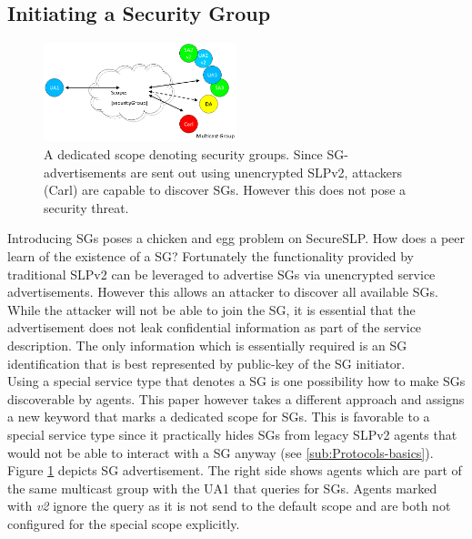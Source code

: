 \subsection{Initiating a Security Group}
\begin{figure}[!h]
\centering\includegraphics[width=0.5\textwidth]{Images/security-group_scope}
\caption{\label{fig:SecurityGroup-Scope}A dedicated scope denoting security groups. Since SG-advertisements are sent out using unencrypted SLPv2, attackers (Carl) are capable to discover SGs. However this does not pose a security threat.}
\end{figure}\noindent
Introducing SGs poses a chicken and egg problem on SecureSLP. How does a peer learn of the existence of a SG? Fortunately the functionality provided by traditional SLPv2 can be leveraged to advertise SGs via unencrypted service advertisements. However this allows an attacker to discover all available SGs. While the attacker will not be able to join the SG, it is essential that the advertisement does not leak confidential information as part of the service description. The only information which is essentially required is an SG identification that is best represented by public-key of the SG initiator.\\
Using a special service type that denotes a SG is one possibility how to make SGs discoverable by agents. This paper however takes a different approach and assigns a new keyword that marks a dedicated scope for SGs. This is favorable to a special service type since it practically hides SGs from legacy SLPv2 agents that would not be able to interact with a SG anyway (see \ref{sub:Protocols-basics}). Figure \ref{fig:SecurityGroup-Scope} depicts SG advertisement. The right side shows agents which are part of the same multicast group with the UA1 that queries for SGs. Agents marked with \emph{v2} ignore the query as it is not send to the default scope and are both not configured for the special scope explicitly.

